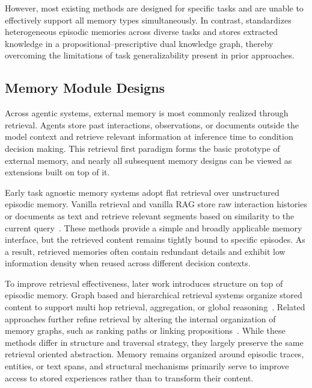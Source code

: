 However, most existing methods are designed for specific tasks and are unable to effectively support all memory types simultaneously. In contrast, \plugmem standardizes heterogeneous episodic memories across diverse tasks and stores extracted knowledge in a propositional–prescriptive dual knowledge graph, thereby overcoming the limitations of task generalizability present in prior approaches.

\subsection{Memory Module Designs}

Across agentic systems, external memory is most commonly realized through retrieval. Agents store past interactions, observations, or documents outside the model context and retrieve relevant information at inference time to condition decision making. This retrieval first paradigm forms the basic prototype of external memory, and nearly all subsequent memory designs can be viewed as extensions built on top of it.

Early task agnostic memory systems adopt flat retrieval over unstructured episodic memory. Vanilla retrieval and vanilla RAG store raw interaction histories or documents as text and retrieve relevant segments based on similarity to the current query~\citep{lewis2021retrievalaugmentedgenerationknowledgeintensivenlp,Wang_2024}. These methods provide a simple and broadly applicable memory interface, but the retrieved content remains tightly bound to specific episodes. As a result, retrieved memories often contain redundant details and exhibit low information density when reused across different decision contexts.

To improve retrieval effectiveness, later work introduces structure on top of episodic memory. Graph based and hierarchical retrieval systems organize stored content to support multi hop retrieval, aggregation, or global reasoning~\citep{edge2025localglobalgraphrag,sarthi2024raptorrecursiveabstractiveprocessing}. Related approaches further refine retrieval by altering the internal organization of memory graphs, such as ranking paths or linking propositions~\citep{gutiérrez2025ragmemorynonparametriccontinual,Wang_2025}. While these methods differ in structure and traversal strategy, they largely preserve the same retrieval oriented abstraction. Memory remains organized around episodic traces, entities, or text spans, and structural mechanisms primarily serve to improve access to stored experiences rather than to transform their content.

